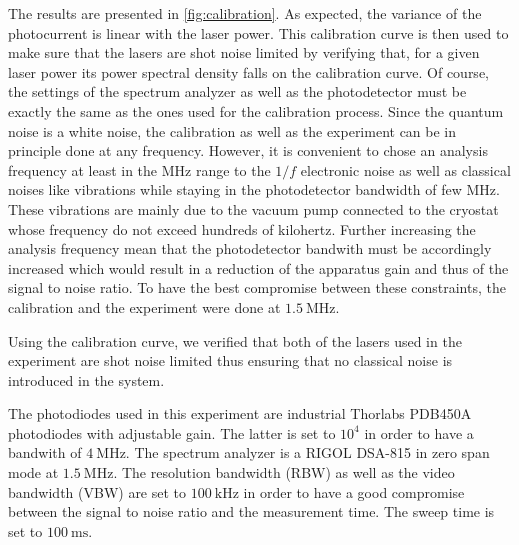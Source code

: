 The results are presented in \autoref{fig:calibration}.
As expected, the variance of the photocurrent is linear with the laser power. This calibration curve is then used to make sure that the lasers are shot noise limited by verifying that, for a given laser power 
its power spectral density falls on the calibration curve. Of course, the settings of the spectrum analyzer as well as the photodetector must be exactly the same as the ones used for the calibration process. Since the quantum noise 
is a white noise, the calibration as well as the experiment can be in principle done at any frequency. However, it is convenient to chose an analysis frequency at least in the MHz range to the $1/f$ electronic noise as well as classical noises like vibrations while staying in the photodetector bandwidth of few MHz. These vibrations are mainly due to the vacuum pump connected to the cryostat whose 
frequency do not exceed hundreds of kilohertz. Further increasing the analysis frequency mean that the photodetector bandwith must be accordingly increased which would result in a reduction of the apparatus gain and thus of the signal to noise ratio.
To have the best compromise between these constraints, the calibration and the experiment were done at $\SI{1.5}{\mega\hertz}$. 

Using the calibration curve, we verified that both of the lasers used in the experiment are shot noise limited thus ensuring that no classical noise is introduced in the system.
 


The photodiodes used in this experiment are industrial Thorlabs PDB450A photodiodes with adjustable gain. The latter is set to $10^4$ in order to have a bandwith of $\SI{4}{\mega\hertz}$.
The spectrum analyzer is a RIGOL DSA-815 in zero span mode at $\SI{1.5}{\mega\hertz}$. The resolution bandwidth (RBW) as well as the video bandwidth (VBW) are set to $\SI{100}{\kilo\hertz}$ in order to have a good compromise between the signal to noise ratio and the measurement time.
The sweep time is set to $\SI{100}{\milli\second}$.


